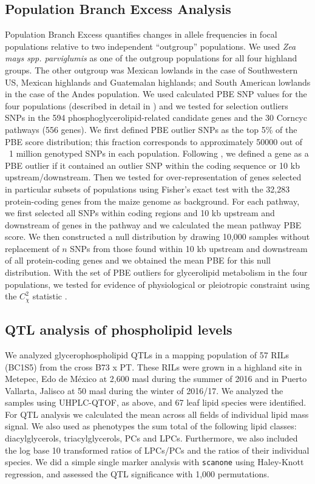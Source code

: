 \subsection{Population Branch Excess Analysis}
Population Branch Excess quantifies changes in allele frequencies in focal populations relative to two independent “outgroup” populations.
We used \textit{Zea mays spp. parviglumis} as one of the outgroup populations for all four highland groups.  
The other outgroup was  Mexican lowlands in the case of Southwestern US, Mexican highlands and Guatemalan highlands; and South American lowlands in the case of the Andes population. 
We used calculated PBE SNP values for the four populations (described in detail in \citep{wang2020-mp}) and we tested for selection outliers SNPs in the 594 phosphoglycerolipid-related candidate genes and the 30 Corncyc pathways (556 genes).
We first defined PBE outlier SNPs as the top 5\% of the PBE score distribution; this fraction corresponds to approximately 50000 out of ~1 million genotyped SNPs in each population. 
Following \citep{wang2020-mp}, we defined a gene as a PBE outlier if it contained an outlier SNP within the coding sequence or 10 kb upstream/downstream. 
Then we tested for over-representation of genes selected in particular subsets of populations using Fisher's exact test with the 32,283 protein-coding genes from the maize genome as background. 
For each pathway, we first selected all SNPs within coding regions and 10 kb upstream and downstream of genes in the pathway and we calculated the mean pathway PBE score. 
We then constructed a null distribution by drawing 10,000 samples without replacement of $n$ SNPs from those found within 10 kb upstream and downstream of all protein-coding genes and we obtained the mean PBE for this null distribution. 
With the set of PBE outliers for glycerolipid metabolism in the four populations, we tested for evidence of physiological or pleiotropic constraint using the $C_\chi^2$ statistic \citep{yeaman2018}. 

\subsection{QTL analysis of phospholipid levels}
We analyzed glycerophospholipid QTLs in a mapping population of 57 RILs (BC1S5) from the cross B73 x PT.
These RILs were grown in a highland site in Metepec, Edo de M\'exico at 2,600 masl during the summer of 2016 and in Puerto Vallarta, Jalisco at 50 masl during the winter of 2016/17. 
We analyzed the samples using UHPLC-QTOF, as above, and 67 leaf lipid species were identified.
For QTL analysis we calculated the mean across all fields of individual lipid mass signal. 
We also used as phenotypes the sum total of the following lipid classes: diacylglycerols, triacylglycerols, PCs and  LPCs.  
Furthermore,  we also included the log base 10 transformed ratios of LPCs/PCs and the ratios of their individual species. 
We did a simple single marker analysis with \texttt{scanone} using Haley-Knott  regression, and assessed the QTL significance with 1,000 permutations.

